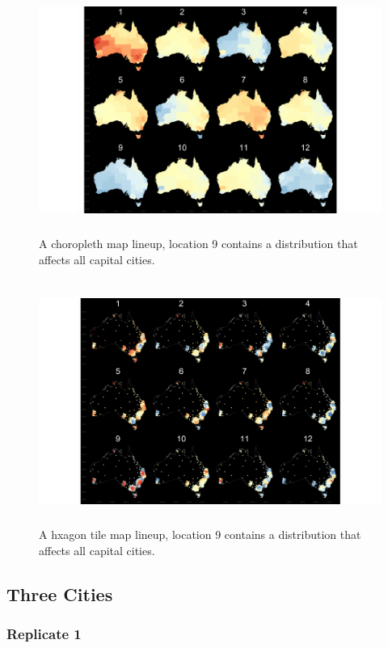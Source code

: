 \documentclass{monashthesis}
\begin{document}
\begin{figure}[H]
\centering
\includegraphics[height=8cm]{lineups/cities-geo9-1.pdf}
\caption{\label{fig:cities-geo9}A choropleth map lineup, location 9 contains a distribution that affects all capital cities.}
\end{figure}

\begin{figure}[H]
\centering
\includegraphics[height=8cm]{lineups/cities-hex9-1.pdf}
\caption{\label{fig:cities-hex9}A hxagon tile map lineup, location 9 contains a distribution that affects all capital cities.}
\end{figure}

\newpage

\hypertarget{three-cities}{%
\subsection{Three Cities}\label{three-cities}}

\hypertarget{replicate-1-1}{%
\subsubsection{Replicate 1}\label{replicate-1-1}}
\end{document}
